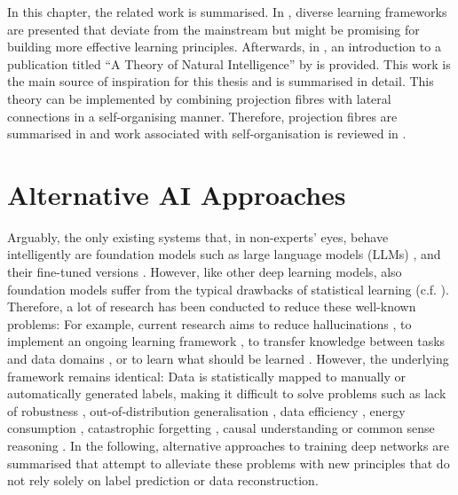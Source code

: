 In this chapter, the related work is summarised. In , diverse learning frameworks are presented that deviate from the mainstream but might be promising for building more effective learning principles. Afterwards, in , an introduction to a publication titled ``A Theory of Natural Intelligence'' by  is provided. This work is the main source of inspiration for this thesis and is summarised in detail.
This theory can be implemented by combining projection fibres with lateral connections in a self-organising manner. Therefore, projection fibres are summarised in  and work associated with self-organisation is reviewed in .


\section{Alternative AI Approaches}
Arguably, the only existing systems that, in non-experts' eyes, behave intelligently are foundation models such as large language models (LLMs) , and their fine-tuned versions . However, like other deep learning models, also foundation models suffer from the typical drawbacks of statistical learning (c.f. ). Therefore, a lot of research has been conducted to reduce these well-known problems: For example, current research aims to reduce hallucinations , to implement an ongoing learning framework , to transfer knowledge between tasks and data domains , or to learn what should be learned \cite{thrun_introduction_1998, hospedales_meta-learning_2022}. However, the underlying framework remains identical: Data is statistically mapped to manually or automatically generated labels, making it difficult to solve problems such as lack of robustness \cite{akhtar_threat_2018, long_survey_2022},  out-of-distribution generalisation \cite{madan_when_2022}, data efficiency \cite{marcus_deep_2018, smith_using_2022}, energy consumption \cite{garcia-martin_estimation_2019}, catastrophic forgetting \cite{kirkpatrick_overcoming_2017}, causal understanding or common sense reasoning \cite{rosenbloom_defining_2023, mitchell_debate_2023}. In the following, alternative approaches to training deep networks are summarised that attempt to alleviate these problems with new principles that do not rely solely on label prediction or data reconstruction. 

